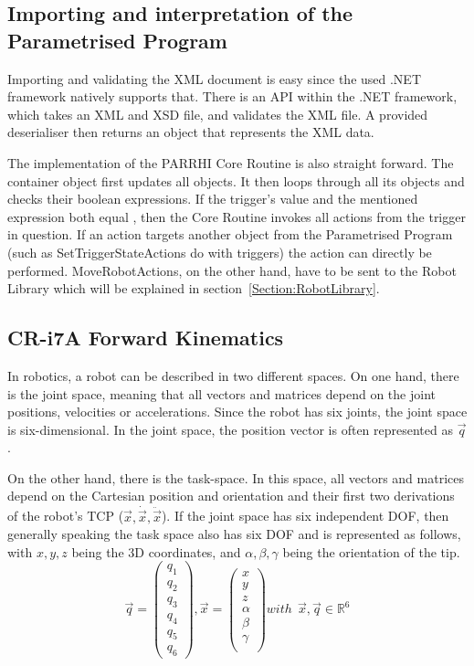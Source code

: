 \subsection{Importing and interpretation of the Parametrised Program}

Importing and validating the XML document is easy since the used .NET framework natively supports that. There is an API within the .NET framework, which takes an XML and XSD file, and validates the XML file. A provided deserialiser then returns an object that represents the XML data.

The implementation of the PARRHI Core Routine is also straight forward. The container object first updates all  objects. It then loops through all its  objects and checks their boolean expressions. If the trigger's  value and the mentioned expression both equal , then the Core Routine invokes all actions from the trigger in question. If an action targets another object from the Parametrised Program (such as SetTriggerStateActions do with triggers) the action can directly be performed. MoveRobotActions, on the other hand, have to be sent to the Robot Library which will be explained in section~\ref{Section:RobotLibrary}.

\subsection{CR-i7A Forward Kinematics}\label{Section:ForwardKinematics}
In robotics, a robot can be described in two different spaces. On one hand, there is the joint space, meaning that all vectors and matrices depend on the joint positions, velocities or accelerations. Since the robot has six joints, the joint space is six-dimensional. In the joint space, the position vector is often represented as $ \vec{q} $.

On the other hand, there is the task-space. In this space, all vectors and matrices depend on the Cartesian position and orientation and their first two derivations of the robot's TCP ($ \vec{x}, \dot{\vec{x}}, \ddot{\vec{x}} $). If the joint space has six independent DOF, then generally speaking the task space also has six DOF and is represented as follows, with $x,y,z$ being the 3D coordinates, and $\alpha, \beta, \gamma $ being the orientation of the tip.
\[ \vec{q} = \begin{pmatrix} q_1 \\ q_2 \\ q_3 \\ q_4 \\ q_5 \\ q_6 \end{pmatrix}, \vec{x} = \begin{pmatrix} x \\ y \\ z \\ \alpha \\ \beta \\ \gamma \\ \end{pmatrix} with~~\vec{x},\vec{q} \in \mathbb{R}^6  \]


